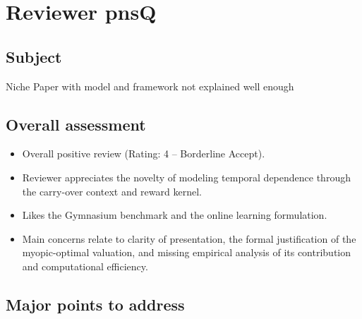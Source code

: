 \documentclass[11pt]{article}
\begin{document}
\section*{Reviewer pnsQ}

\subsection*{Subject}
Niche Paper with model and framework not explained well enough

\subsection*{Overall assessment}

\begin{itemize}
    \item Overall positive review (Rating: 4 -- Borderline Accept).
    \item Reviewer appreciates the novelty of modeling temporal dependence through the carry-over context and reward kernel.
    \item Likes the Gymnasium benchmark and the online learning formulation.
    \item Main concerns relate to clarity of presentation, the formal justification of the myopic-optimal valuation, and missing empirical analysis of its contribution and computational efficiency.
\end{itemize}

\subsection*{Major points to address}
\end{document}
